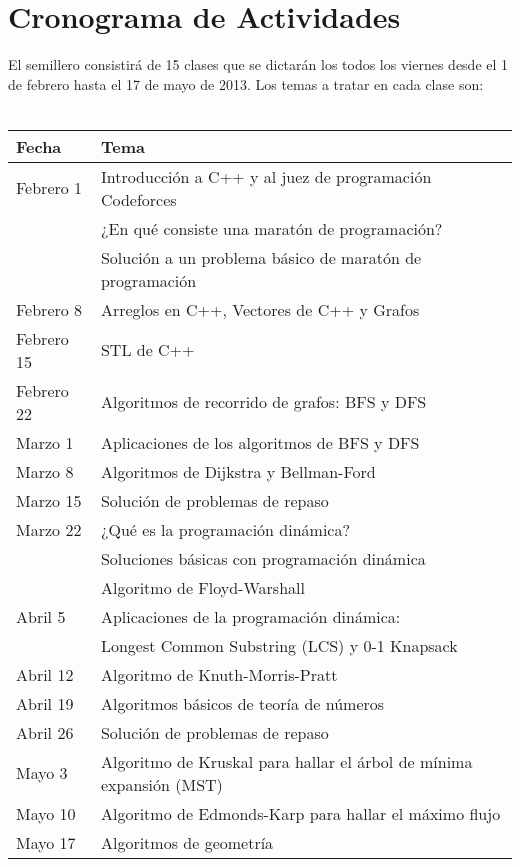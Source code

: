 \documentclass[11pt, oneside]{article}
\theoremstyle{definition}
\theoremstyle{remark}
\begin{document}
\section{Cronograma de Actividades}
El semillero consistirá de 15 clases que se dictarán los todos los viernes desde el 1 de febrero hasta el 17 de mayo de 2013. Los temas a tratar en cada clase son: \\ \quad \\
\begin{tabular}{|l|l|}
	\hline
	\textbf{Fecha} & \textbf{Tema} \\
	\hline \hline
	Febrero 1 & Introducción a C++ y al juez de programación Codeforces\\
	          & ¿En qué consiste una maratón de programación?\\
			  & Solución a un problema básico de maratón de programación  \qquad \qquad \qquad \qquad\\
	\hline
	Febrero 8 & Arreglos en C++, Vectores de C++ y Grafos\\
	\hline
	Febrero 15 & STL de C++\\
	\hline
	Febrero 22 & Algoritmos de recorrido de grafos: BFS y DFS\\
	\hline
	Marzo 1 & Aplicaciones de los algoritmos de BFS y DFS\\
	\hline
	Marzo 8 & Algoritmos de Dijkstra y Bellman-Ford\\
	\hline
	Marzo 15 & Solución de problemas de repaso\\
	\hline
	Marzo 22 & ¿Qué es la programación dinámica?\\
	         & Soluciones básicas con programación dinámica\\
	         & Algoritmo de Floyd-Warshall\\
	\hline
	Abril 5 & Aplicaciones de la programación dinámica:\\
	        & Longest Common Substring (LCS) y 0-1 Knapsack\\
	\hline
	Abril 12 & Algoritmo de Knuth-Morris-Pratt\\
	\hline
	Abril 19 & Algoritmos básicos de teoría de números\\
	\hline
	Abril 26 & Solución de problemas de repaso\\
	\hline
	Mayo 3 & Algoritmo de Kruskal para hallar el árbol de mínima expansión (MST)\\
	\hline
	Mayo 10 & Algoritmo de Edmonds-Karp para hallar el máximo flujo\\
	\hline
	Mayo 17 & Algoritmos de geometría\\
	\hline
\end{tabular}
\end{document}
